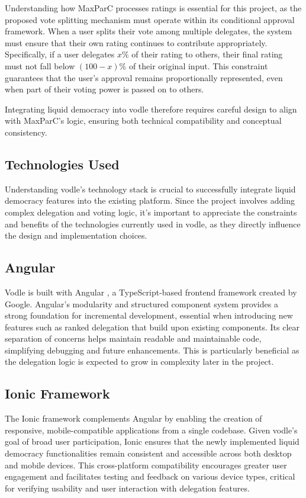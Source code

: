 Understanding how MaxParC processes ratings is essential for this project, as the proposed vote splitting mechanism must operate within its conditional approval framework. When a user splits their vote among multiple delegates, the system must ensure that their own rating continues to contribute appropriately. Specifically, if a user delegates $x\%$ of their rating to others, their final rating must not fall below $(100-x)\%$ of their original input. This constraint guarantees that the user's approval remains proportionally represented, even when part of their voting power is passed on to others.

Integrating liquid democracy into vodle therefore requires careful design to align with MaxParC's logic, ensuring both technical compatibility and conceptual consistency.

\subsection{Technologies Used}
Understanding vodle's technology stack is crucial to successfully integrate liquid democracy features into the existing platform. Since the project involves adding complex delegation and voting logic, it's important to appreciate the constraints and benefits of the technologies currently used in vodle, as they directly influence the design and implementation choices.

\subsection*{Angular}
Vodle is built with Angular \citep{angular}, a TypeScript-based frontend framework created by Google. Angular's modularity and structured component system provides a strong foundation for incremental development, essential when introducing new features such as ranked delegation that build upon existing components. Its clear separation of concerns helps maintain readable and maintainable code, simplifying debugging and future enhancements. This is particularly beneficial as the delegation logic is expected to grow in complexity later in the project.

\subsection*{Ionic Framework}
The Ionic \citep{ionic} framework complements Angular by enabling the creation of responsive, mobile-compatible applications from a single codebase. Given vodle's goal of broad user participation, Ionic ensures that the newly implemented liquid democracy functionalities remain consistent and accessible across both desktop and mobile devices. This cross-platform compatibility encourages greater user engagement and facilitates testing and feedback on various device types, critical for verifying usability and user interaction with delegation features.

